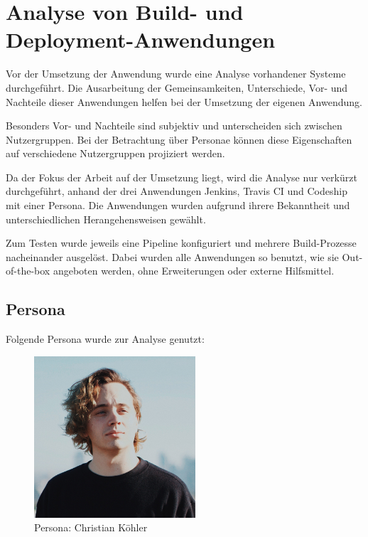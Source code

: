 \chapter{Analyse von Build- und Deployment-Anwendungen}

Vor der Umsetzung der Anwendung wurde eine Analyse vorhandener Systeme durchgeführt. Die Ausarbeitung der Gemeinsamkeiten, Unterschiede, Vor- und Nachteile dieser Anwendungen helfen bei der Umsetzung der eigenen Anwendung.

Besonders Vor- und Nachteile sind subjektiv und unterscheiden sich zwischen Nutzergruppen. Bei der Betrachtung über Personae können diese Eigenschaften auf verschiedene Nutzergruppen projiziert werden.

Da der Fokus der Arbeit auf der Umsetzung liegt, wird die Analyse nur verkürzt durchgeführt, anhand der drei Anwendungen Jenkins, Travis CI und Codeship mit einer Persona. Die Anwendungen wurden aufgrund ihrere Bekanntheit und unterschiedlichen Herangehensweisen gewählt.

Zum Testen wurde jeweils eine Pipeline konfiguriert und mehrere Build-Prozesse nacheinander ausgelöst. Dabei wurden alle Anwendungen so benutzt, wie sie Out-of-the-box angeboten werden, ohne Erweiterungen oder externe Hilfsmittel.

\section{Persona}

Folgende Persona wurde zur Analyse genutzt:

\begin{figure}[h]
  \caption{Persona: Christian Köhler}
  \label{fig:persona}
  \includegraphics[width=6cm]{assets/persona}
\end{figure}

